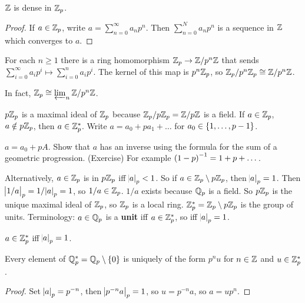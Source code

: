 \begin{corollary}
$ \mathbb{Z} $ is dense in $ \mathbb{Z}_p $.
\end{corollary}

\begin{proof}
If $ a \in \mathbb{Z}_p $, write $ a = \sum_{n = 0}^\infty a_np^n $. Then $ \sum_{n = 0}^N a_np^n $ is a sequence in $ \mathbb{Z} $ which converges to $ a $.
\end{proof}

For each $ n \ge 1 $ there is a ring homomorphism $ \mathbb{Z}_p \to \mathbb{Z} / p^n\mathbb{Z} $ that sends $ \sum_{i = 0}^\infty a_ip^i \mapsto \sum_{i = 0}^n a_ip^i $. The kernel of this map is $ p^n\mathbb{Z}_p $, so $ \mathbb{Z}_p / p^n\mathbb{Z}_p \cong \mathbb{Z} / p^n\mathbb{Z} $.

\begin{note*}
In fact, $ \mathbb{Z}_p \cong \varprojlim_n \mathbb{Z} / p^n\mathbb{Z} $.
\end{note*}

\pagebreak

$ p\mathbb{Z}_p $ is a maximal ideal of $ \mathbb{Z}_p $ because $ \mathbb{Z}_p / p\mathbb{Z}_p = \mathbb{Z} / p\mathbb{Z} $ is a field. If $ a \in \mathbb{Z}_p $, $ a \notin p\mathbb{Z}_p $, then $ a \in \mathbb{Z}_p^* $. Write $ a = a_0 + pa_1 + \dots $ for $ a_0 \in \cbr{1, \dots, p - 1} $.

\begin{example*}
$ a = a_0 + pA $. Show that $ a $ has an inverse using the formula for the sum of a geometric progression. (Exercise) For example $ \br{1 - p}^{-1} = 1 + p + \dots $.
\end{example*}

Alternatively, $ a \in \mathbb{Z}_p $ is in $ p\mathbb{Z}_p $ iff $ \abs{a}_p < 1 $. So if $ a \in \mathbb{Z}_p \setminus p\mathbb{Z}_p $, then $ \abs{a}_p = 1 $. Then $ \abs{1 / a}_p = 1 / \abs{a}_p = 1 $, so $ 1 / a \in \mathbb{Z}_p $. $ 1 / a $ exists because $ \mathbb{Q}_p $ is a field. So $ p\mathbb{Z}_p $ is the unique maximal ideal of $ \mathbb{Z}_p $, so $ \mathbb{Z}_p $ is a local ring. $ \mathbb{Z}_p^* = \mathbb{Z}_p \setminus p\mathbb{Z}_p $ is the group of units. Terminology: $ a \in \mathbb{Q}_p $ is a \textbf{unit} iff $ a \in \mathbb{Z}_p^* $, so iff $ \abs{a}_p = 1 $.

\begin{lemma}
$ a \in \mathbb{Z}_p^* $ iff $ \abs{a}_p = 1 $.
\end{lemma}

\begin{corollary}
Every element of $ \Q_p^* = \Q_p \setminus \cbr{0} $ is uniquely of the form $ p^nu $ for $ n \in \mathbb{Z} $ and $ u \in \mathbb{Z}_p^* $.
\end{corollary}

\begin{proof}
Set $ \abs{a}_p = p^{-n} $, then $ \abs{p^{-n}a}_p = 1 $, so $ u = p^{-n}a $, so $ a = up^n $.
\end{proof}

